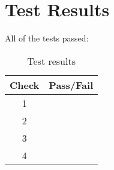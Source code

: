 \section{Test Results}

All of the tests passed:
\begin{table}[H]
	\caption{Test results}
	\label{tab:results}
	\centering \fontsize{10}{10}\selectfont
	\begin{tabular}{c | c  } %
		\hline\hline
	   \textbf{Check} 	&\textbf{Pass/Fail} \\ \hline
	   1	   			&  \\ 
	   2	   			&  \\ 
	   3	   			&  \\ 
	   4	   			&  \\ 
	   \hline\hline
	\end{tabular}
\end{table}





